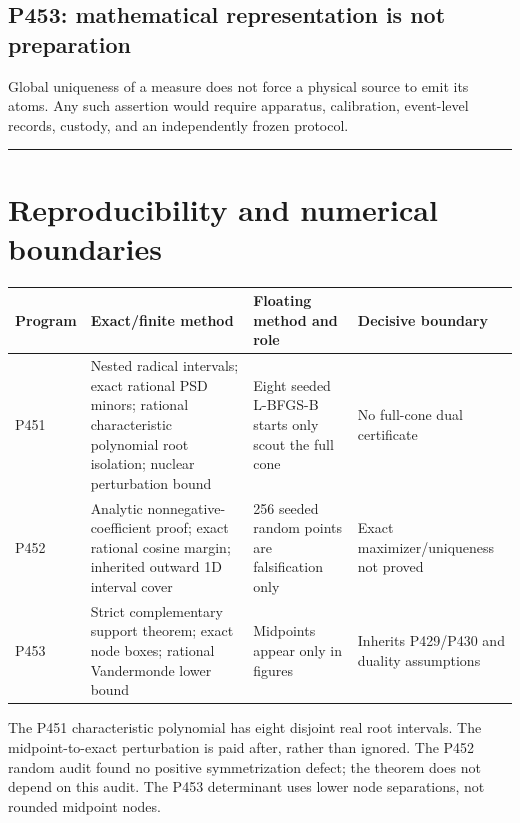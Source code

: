 \documentclass[11pt,a4paper,openany]{report}
\begin{document}
\section{P453: mathematical representation is not preparation}

Global uniqueness of a measure does not force a physical source to emit its atoms. Any such assertion would require apparatus, calibration, event-level records, custody, and an independently frozen protocol.

\par\medskip\hrule\medskip

\chapter{Reproducibility and numerical boundaries}

\begin{center}
\begingroup\small
\setlength{\tabcolsep}{2.5pt}
\renewcommand{\arraystretch}{1.16}
\begin{longtable}{@{}p{}p{}p{}p{}@{}}
\toprule
\textbf{Program} & \textbf{Exact/\allowbreak{}finite method} & \textbf{Floating method and role} & \textbf{Decisive boundary} \\
\midrule
\endhead
P451 & Nested radical intervals; exact rational PSD minors; rational characteristic polynomial root isolation; nuclear perturbation bound & Eight seeded L-BFGS-B starts only scout the full cone & No full-cone dual certificate \\
P452 & Analytic nonnegative-coefficient proof; exact rational cosine margin; inherited outward 1D interval cover & 256 seeded random points are falsification only & Exact maximizer/\allowbreak{}uniqueness not proved \\
P453 & Strict complementary support theorem; exact node boxes; rational Vandermonde lower bound & Midpoints appear only in figures & Inherits P429/\allowbreak{}P430 and duality assumptions \\
\bottomrule
\end{longtable}
\endgroup
\end{center}

The P451 characteristic polynomial has eight disjoint real root intervals. The midpoint-to-exact perturbation is paid after, rather than ignored. The P452 random audit found no positive symmetrization defect; the theorem does not depend on this audit. The P453 determinant uses lower node separations, not rounded midpoint nodes.
\end{document}
